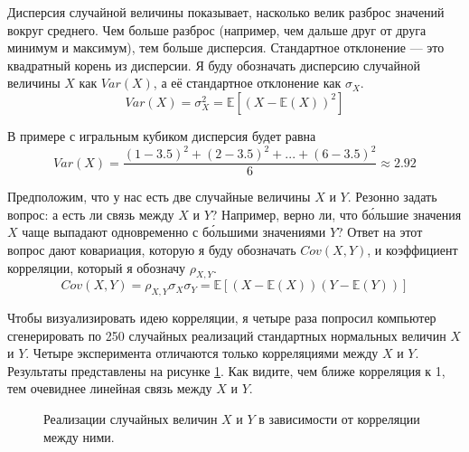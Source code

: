 Дисперсия случайной величины показывает, насколько велик разброс значений вокруг среднего. Чем больше разброс (например, чем дальше друг от друга минимум и максимум), тем больше дисперсия. Стандартное отклонение --- это квадратный корень из дисперсии. Я буду обозначать дисперсию случайной величины $X$ как  $Var(X)$, а её стандартное отклонение как $\sigma_X$.
\begin{equation*}
Var(X) = \sigma_X^2 = \mathbb{E}\left[(X - \mathbb{E}(X))^2 \right]
\end{equation*}

В примере с игральным кубиком дисперсия будет равна
\begin{equation*}
Var(X) = \dfrac{(1 - 3.5)^2 + (2 - 3.5)^2 + ... + (6 - 3.5)^2}{6} \approx 2.92
\end{equation*}

Предположим, что у нас есть две случайные величины $X$ и $Y$. Резонно задать вопрос: а есть ли связь между $X$ и $Y$? Например, верно ли, что б\'{о}льшие значения $X$ чаще выпадают одновременно с б\'{о}льшими значениями $Y$? Ответ на этот вопрос дают ковариация, которую я буду обозначать $Cov(X,Y)$, и коэффициент корреляции, который я обозначу $\rho_{X,Y}$.
\begin{equation*}
Cov(X,Y) = \rho_{X,Y}\sigma_X\sigma_Y = \mathbb{E}\left[(X - \mathbb{E}(X))(Y - \mathbb{E}(Y)) \right]
\end{equation*}

Чтобы визуализировать идею корреляции, я четыре раза попросил компьютер сгенерировать по 250 случайных реализаций стандартных нормальных величин $X$ и $Y$. Четыре эксперимента отличаются только корреляциями между $X$ и $Y$. Результаты представлены на рисунке \ref{covariance_example}. Как видите, чем ближе корреляция к 1, тем очевиднее линейная связь между $X$ и $Y$.

\begin{figure}[h]
\centering
{}
\caption{Реализации случайных величин $X$ и $Y$ в зависимости от корреляции между ними.}
\label{covariance_example}
\end{figure}

